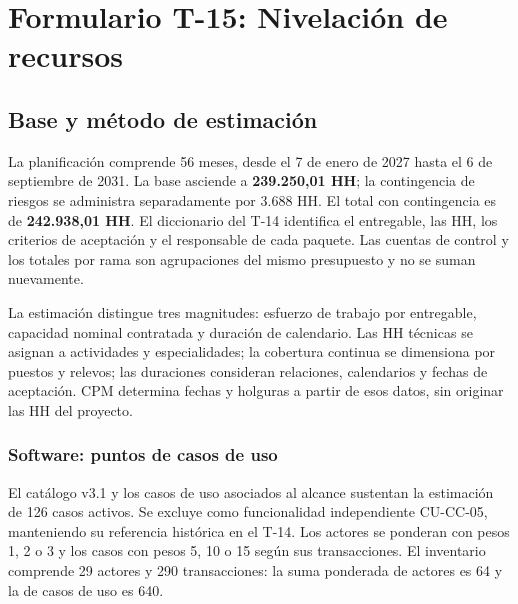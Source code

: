 \documentclass[11pt]{article}
\begin{document}
\renewcommand{\listtablename}{Índice de tablas}
\renewcommand{\tablename}{Tabla}
\renewcommand{\thetable}{T-15.\arabic{table}}
\renewcommand{\thefigure}{T-15.\arabic{figure}}
\tableofcontents
\clearpage
\listoffigures
\listoftables
\clearpage
\section*{Formulario T-15: Nivelación de recursos}

\subsection{Base y método de estimación}

La planificación comprende 56 meses, desde el 7 de enero de 2027 hasta el 6 de septiembre de 2031. La base asciende a \textbf{239.250,01 HH}; la contingencia de riesgos se administra separadamente por 3.688 HH. El total con contingencia es de \textbf{242.938,01 HH}. El diccionario del T-14 identifica el entregable, las HH, los criterios de aceptación y el responsable de cada paquete. Las cuentas de control y los totales por rama son agrupaciones del mismo presupuesto y no se suman nuevamente.

La estimación distingue tres magnitudes: esfuerzo de trabajo por entregable, capacidad nominal contratada y duración de calendario. Las HH técnicas se asignan a actividades y especialidades; la cobertura continua se dimensiona por puestos y relevos; las duraciones consideran relaciones, calendarios y fechas de aceptación. CPM determina fechas y holguras a partir de esos datos, sin originar las HH del proyecto.

\subsubsection{Software: puntos de casos de uso}

El catálogo v3.1 y los casos de uso asociados al alcance sustentan la estimación de 126 casos activos. Se excluye como funcionalidad independiente CU-CC-05, manteniendo su referencia histórica en el T-14. Los actores se ponderan con pesos 1, 2 o 3 y los casos con pesos 5, 10 o 15 según sus transacciones. El inventario comprende 29 actores y 290 transacciones: la suma ponderada de actores es 64 y la de casos de uso es 640.
\end{document}
